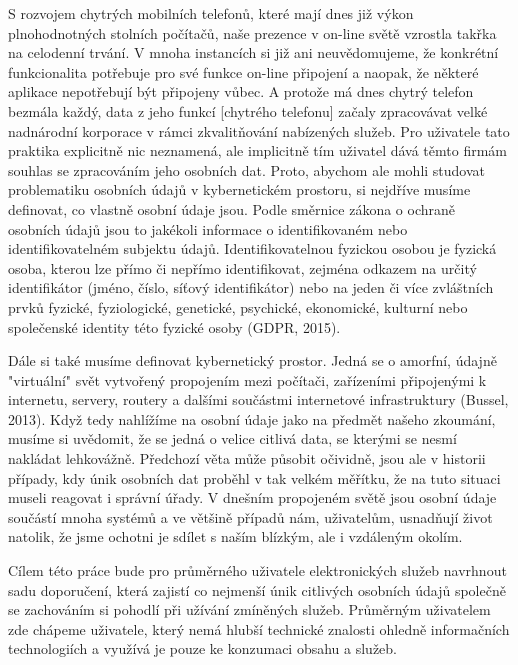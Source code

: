 \documentclass{article}
\begin{document}
\begin{spacing}{1.15}
		S rozvojem chytrých mobilních telefonů, které mají dnes již výkon plnohodnotných stolních počítačů, naše prezence v on-line světě vzrostla takřka na celodenní trvání. V mnoha instancích si již ani neuvědomujeme, že konkrétní funkcionalita potřebuje pro své funkce on-line připojení a naopak, že některé aplikace nepotřebují být připojeny vůbec. A protože má dnes chytrý telefon bezmála každý, data z jeho funkcí [chytrého telefonu] začaly zpracovávat velké nadnárodní korporace v rámci zkvalitňování nabízených služeb. Pro uživatele tato praktika explicitně nic neznamená, ale implicitně tím uživatel dává těmto firmám souhlas se zpracováním jeho osobních dat. Proto, abychom ale mohli studovat problematiku osobních údajů v kybernetickém prostoru, si nejdříve musíme definovat, co vlastně osobní údaje jsou. Podle směrnice zákona o ochraně osobních údajů jsou to jakékoli informace o identifikovaném nebo identifikovatelném subjektu údajů. Identifikovatelnou fyzickou osobou je fyzická osoba, kterou lze přímo či nepřímo identifikovat, zejména odkazem na určitý identifikátor (jméno, číslo, síťový identifikátor) nebo na jeden či více zvláštních prvků fyzické, fyziologické, genetické, psychické, ekonomické, kulturní nebo společenské identity této fyzické osoby (GDPR, 2015).
		
		Dále si také musíme definovat kybernetický prostor. Jedná se o amorfní, údajně "virtuální" svět vytvořený propojením mezi počítači, zařízeními připojenými k internetu, servery, routery a dalšími součástmi internetové infrastruktury (Bussel, 2013). Když tedy nahlížíme na osobní údaje jako na předmět našeho zkoumání, musíme si uvědomit, že se jedná o velice citlivá data, se kterými se nesmí nakládat lehkovážně. Předchozí věta může působit očividně, jsou ale v historii případy, kdy únik osobních dat proběhl v tak velkém měřítku, že na tuto situaci museli reagovat i správní úřady. V dnešním propojeném světě jsou osobní údaje součástí mnoha systémů a ve většině případů nám, uživatelům, usnadňují život natolik, že jsme ochotni je sdílet s naším blízkým, ale i vzdáleným okolím.
		
		Cílem této práce bude pro průměrného uživatele elektronických služeb navrhnout sadu doporučení, která zajistí co nejmenší únik citlivých osobních údajů společně se zachováním si pohodlí při užívání zmíněných služeb. Průměrným uživatelem zde chápeme uživatele, který nemá hlubší technické znalosti ohledně informačních technologiích a využívá je pouze ke konzumaci obsahu a služeb. 
		

\end{spacing}
\end{document}
